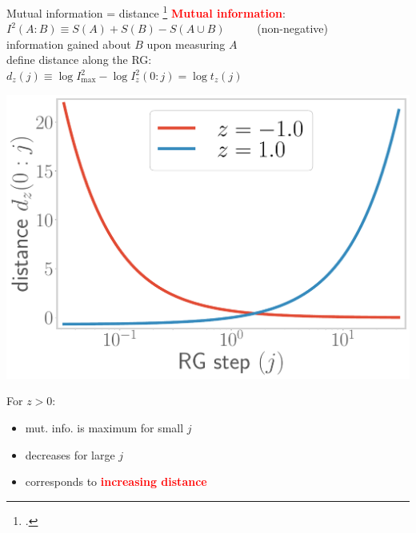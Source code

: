 \documentclass[12pt,aspectratio=169]{beamer}
\newcommand{\focus}[1]{\textcolor{red}{\bf{#1}}}
\begin{document}
\begin{frame}{Mutual information = distance}
\footcite{van2010building,lee2016,anirban_mott_2022}
	\focus{Mutual information}: ~ \(I^2(A:B) \equiv S(A) + S(B) - S(A \cup B)\) ~ ~ ~ (non-negative)\\[10pt]
	information gained about \(B\) upon measuring \(A\)\\[10pt]
	define distance along the RG: ~ ~ \(d_z(j) \equiv \log I^2_\text{max} - \log I_z^2(0:j) = \log t_z(j)\)

	\vspace*{\fill}

	\begin{minipage}{0.4\textwidth}
	\includegraphics[width=\textwidth]{figures/distance1.pdf}
	\end{minipage}
	\hspace*{\fill}
	\begin{minipage}{0.55\textwidth}
		\centering
		For \(z > 0\):\\[5pt]
		\begin{itemize}
			\item mut. info. is maximum for small \(j\)\\[10pt]
			\item decreases for large \(j\)\\[10pt]
			\item corresponds to \focus{increasing distance}
		\end{itemize}
	\end{minipage}
\end{frame}
\end{document}
